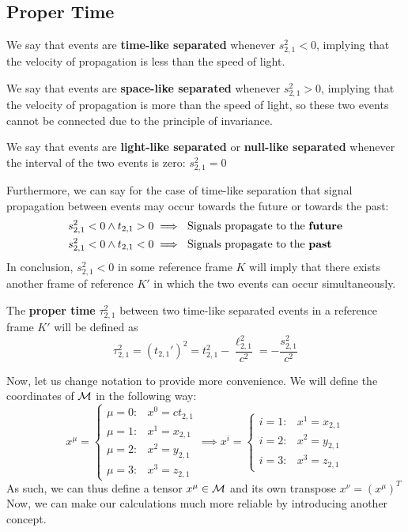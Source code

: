 \documentclass{article}
\begin{document}
		\subsection{Proper Time}
			\begin{defn}
				We say that events are \textbf{time-like separated} whenever $s_{2,1}^2 < 0$, implying that the velocity of propagation is less than the speed of light.
			\end{defn}
			\begin{defn}
				We say that events are \textbf{space-like separated} whenever $s_{2,1}^2 > 0$, implying that the velocity of propagation is more than the speed of light, so these two events cannot be connected due to the principle of invariance.
			\end{defn}
			\begin{defn}
				We say that events are \textbf{light-like separated} or \textbf{null-like separated} whenever the interval of the two events is zero: $s_{2,1}^2 = 0$
			\end{defn}
			Furthermore, we can say for the case of time-like separation that signal propagation between events may occur towards the future or towards the past:
			\begin{align*}
				s_{2,1}^2 < 0 \land t_{2,1} > 0 &\implies \text{ Signals propagate to the \textbf{future}} \\
				s_{2,1}^2 < 0 \land t_{2,1} < 0 &\implies \text{ Signals propagate to the \textbf{past}}
			\end{align*}
			In conclusion, $s_{2,1}^2 < 0$ in some reference frame $K$ will imply that there exists another frame of reference $K'$ in which the two events can occur simultaneously.
			\begin{defn}
				The \textbf{proper time} $\tau_{2,1}^2$ between two time-like separated events in a reference frame $K'$ will be defined as
				\vspace{1cm}
				\begin{equation}
					\label{eq:ProperTime}
					\boxed{\tau_{2,1}^2 = (t_{2,1}')^2 = t_{2,1}^2 - \frac{\ell_{2,1}^2}{c^2} = -\frac{s_{2,1}^2}{c^2}}
				\end{equation}
			\end{defn}
		
		\pagebreak
			Now, let us change notation to provide more convenience. We will define the coordinates of $\mathcal{M}$ in the following way:
			$$ x^\mu = \begin{cases}
				\mu=0: & x^0 = ct_{2,1} \\
				\mu=1: & x^1 = x_{2,1} \\
				\mu=2: & x^2 = y_{2,1} \\
				\mu=3: & x^3 = z_{2,1}
			\end{cases} \implies x^i = \begin{cases}
			i=1: & x^1=x_{2,1} \\
			i=2: & x^2=y_{2,1} \\
			i=3: & x^3=z_{2,1}
		\end{cases}$$
		As such, we can thus define a tensor $x^\mu \in \mathcal{M}$ and its own transpose $x^\nu = (x^\mu)^T$ Now, we can make our calculations much more reliable by introducing another concept.
		
\end{document}
